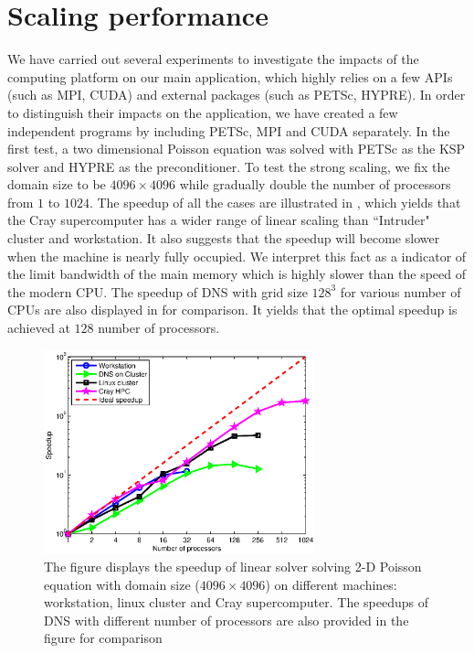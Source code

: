 \section{Scaling performance}
We have carried out several experiments to investigate the impacts of the
computing platform on our main application, which highly relies on a
few APIs (such as MPI, CUDA) and external packages (such as
PETSc, HYPRE).  In order to distinguish their impacts on the application, we have
created a few independent programs by including PETSc, MPI and CUDA separately.
In the first test, a two dimensional Poisson equation was solved with PETSc as
the KSP solver and HYPRE as the preconditioner. To test the strong scaling, we
fix the domain size to be $4096\times 4096$ while gradually double the number
of processors from $1$ to $1024$. The speedup of all the cases are illustrated in , 
which yields that the Cray supercomputer has a wider range of linear scaling than ``Intruder" cluster
and workstation. It also suggests that the speedup will become slower
when the machine is nearly fully occupied. We interpret this fact as a
indicator of the limit bandwidth of the main memory which is highly slower than
the speed of the modern CPU. The speedup of DNS with grid size $128^3$ for various 
number of CPUs are also displayed in  for comparison. It yields 
that the optimal speedup is achieved at $128$ number of processors.  

\begin{figure}[!htbp]\center
\includegraphics[width=0.7\textwidth]{Figures/petsc_scaling}
\caption{The figure displays the speedup of linear solver solving 2-D Poisson equation with domain size ($4096\times 4096$) on different machines: workstation, linux cluster and Cray supercomputer. The speedups of DNS with different number of processors are also provided in the figure for comparison\label{petsc_speedup}}
\end{figure}

